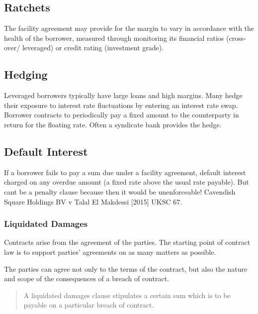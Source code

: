\documentclass[
]{article}
\begin{document}
\hypertarget{ratchets}{%
\subsection{Ratchets}\label{ratchets}}

The facility agreement may provide for the margin to vary in accordance
with the health of the borrower, measured through monitoring its
financial ratios (cross-over/ leveraged) or credit rating (investment
grade).

\hypertarget{hedging}{%
\subsection{Hedging}\label{hedging}}

Leveraged borrowers typically have large loans and high margins. Many
hedge their exposure to interest rate fluctuations by entering an
interest rate swap. Borrower contracts to periodically pay a fixed
amount to the counterparty in return for the floating rate. Often a
syndicate bank provides the hedge.

\hypertarget{default-interest}{%
\subsection{Default Interest}\label{default-interest}}

If a borrower fails to pay a sum due under a facility agreement, default
interest charged on any overdue amount (a fixed rate above the usual
rate payable). But cant be a penalty clause because then it would be
unenforceable! Cavendish Square Holdings BV v Talal El Makdessi
{[}2015{]} UKSC 67.

\hypertarget{liquidated-damages}{%
\subsubsection{Liquidated Damages}\label{liquidated-damages}}

Contracts arise from the agreement of the parties. The starting point of
contract law is to support parties' agreements on as many matters as
possible.

The parties can agree not only to the terms of the contract, but also
the nature and scope of the consequences of a breach of contract.

\begin{quote}
A liquidated damages clause stipulates a certain sum which is to be
payable on a particular breach of contract.
\end{quote}
\end{document}
